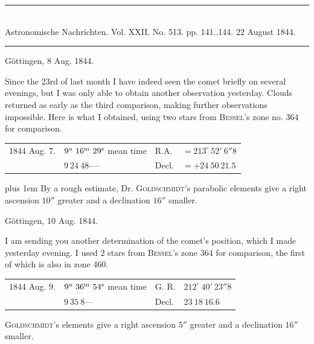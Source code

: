 \clearpage
\hypertarget{native-472-august}{}
\begin{center}
\rule{0.55\linewidth}{0.4pt}\\[2pt]
Astronomische Nachrichten. Vol. XXII. No. 513. pp. 141..144. 22 August 1844.\\[2pt]
\rule{0.55\linewidth}{0.4pt}
\end{center}
\begin{flushright}Göttingen, 8 Aug. 1844.\end{flushright}

Since the 23rd of last month I have indeed seen the comet briefly on several evenings, but I was only able to obtain another observation yesterday. Clouds returned as early as the third comparison, making further observations impossible. Here is what I obtained, using two stars from \textsc{Bessel}’s zone no. 364 for comparison.

\begin{center}
\setlength{\tabcolsep}{3pt}
\begin{tabular}{llll}
1844 Aug. 7. & $9^{\rm u}\ 16^{\rm m}\ 29^{\rm s}$ mean time & R.A. & $=213^\circ\ 52'\ 6''8$ \\
 & $9\ 24\ 48\mathord{\cdot}$\quad --- & Decl. & $=+24\ 50\ 21.5$ \\
\end{tabular}
\end{center}

{\rightskip=0pt plus 1em By a rough estimate, Dr. \textsc{Goldschmidt}’s parabolic elements give a right ascension $10''$ greater and a declination $16''$ smaller.\par}

\begin{flushright}Göttingen, 10 Aug. 1844.\end{flushright}

I am sending you another determination of the comet’s position, which I made yesterday evening. I used 2 stars from \textsc{Bessel}’s zone 364 for comparison, the first of which is also in zone 460.

\begin{center}
\setlength{\tabcolsep}{3pt}
\begin{tabular}{llll}
1844 Aug. 9. & $9^{\rm u}\ 36^{\rm m}\ 54^{\rm s}$ mean time & G. R. & $212^\circ\ 40'\ 23''8$ \\
 & $9\ 35\ 8$\quad --- & Decl. & $23\ 18\ 16.6$ \\
\end{tabular}
\end{center}

\textsc{Goldschmidt}’s elements give a right ascension $5''$ greater and a declination $16''$ smaller.
